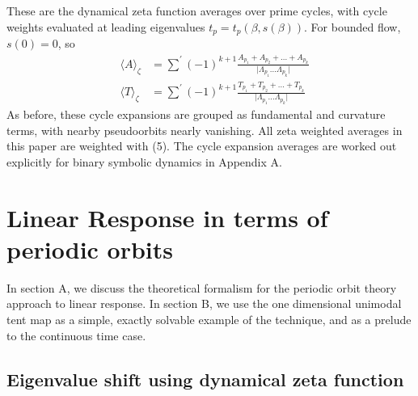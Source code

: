 \documentclass[pre,aps,twocolumn,showpacs,hyperref]{revtex4-1} %
\begin{document}
These are the dynamical zeta function averages over prime cycles, with cycle weights evaluated at leading eigenvalues $t_{p} = t_{p}(\beta,s(\beta))$. For bounded flow, $s(0)=0$, so
\begin{eqnarray*}
&\langle A \rangle_{\zeta}& = \sum^{'}(-1)^{k+1}\frac{A_{p_{1}}+A_{p_{2}}+...+A_{p_{k}}}{\vert \Lambda_{p_{1}}...\Lambda_{p_{k}}\vert}\\
&\langle T \rangle_{\zeta}& = \sum^{'}(-1)^{k+1}\frac{T_{p_{1}}+T_{p_{2}}+...+T_{p_{k}}}{\vert \Lambda_{p_{1}}...\Lambda_{p_{k}}\vert}
\end{eqnarray*}
As before, these cycle expansions are grouped as fundamental and curvature terms, with nearby pseudoorbits nearly vanishing. All zeta weighted averages in this paper are weighted with (5). The cycle expansion averages are worked out explicitly for binary symbolic dynamics in Appendix A.

\section{Linear Response in terms of periodic orbits}

In section A, we discuss the theoretical formalism for the periodic orbit theory approach to linear response. In section B, we use the one dimensional unimodal tent map as a simple, exactly solvable example of the technique, and as a prelude to the continuous time case.

\subsection{Eigenvalue shift using dynamical zeta function}
\end{document}
